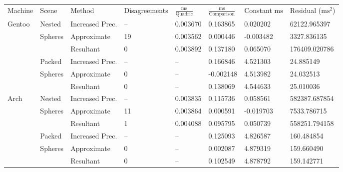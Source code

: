 \begin{tabular}{|l|l|ll|lll|l|}
\hline
Machine & Scene & Method & Disagreements & $\frac{\text{ms}}{\text{Quadric}}$ & $\frac{\text{ms}}{\text{Comparison}}$ & Constant $\text{ms}$ & Residual ($\text{ms}^2$)\\
\hhline{|=|=|==|===|=|}
Gentoo & Nested & Increased Prec. & -- & 0.003670 & 0.163865 & 0.020202 & 62122.965397\\
& Spheres & Approximate & 19 & 0.003562 & 0.000446 & -0.003482 & 3327.836135\\
&& Resultant & 0 & 0.003892 & 0.137180 & 0.065070 & 176409.020786\\
\hline
& Packed & Increased Prec. & -- & -- & 0.166846 & 4.521303 & 24.885149\\
& Spheres & Approximate & 0 & -- & -0.002148 & 4.513982 & 24.032513\\
&& Resultant & 0 & -- & 0.138069 & 4.544633 & 25.010036\\
\hline
Arch & Nested & Increased Prec. & -- & 0.003835 & 0.115736 & 0.058561 & 582387.687854\\
& Spheres & Approximate & 11 & 0.003864 & 0.000591 & -0.019703 & 7533.786715\\
&& Resultant & 1 & 0.004088 & 0.095795 & 0.050739 & 558251.794158\\
\hline
& Packed & Increased Prec. & -- & -- & 0.125093 & 4.826587 & 160.484854\\
& Spheres & Approximate & 0 & -- & 0.002087 & 4.879319 & 159.660490\\
&& Resultant & 0 & -- & 0.102549 & 4.878792 & 159.142771\\
\hline
\end{tabular}
